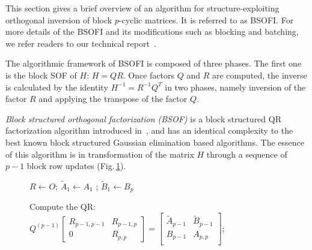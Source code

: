 \documentclass{llncs}
\begin{document}
This section gives a brief overview of an algorithm for 
structure-exploiting orthogonal inversion 
of block $p$-cyclic matrices. It is referred to as BSOFI. 
For more details of the BSOFI and its modifications such as blocking and batching, 
we refer readers to our technical report~\cite{GogolenkoBai13}.

The algorithmic framework of BSOFI is composed of three phases. 
The first one is the block SOF of $H$: $H = QR$.
Once factors $Q$ and $R$ are computed, 
the inverse is calculated by the identity $H^{-1} = R^{-1}Q^T$
in two phases, namely inversion of the factor $R$ 
and applying the transpose of the factor $Q$.

\textit{Block structured orthogonal factorization (BSOF)} 
is a block structured QR factorization algorithm introduced 
in~\cite{Wright92BSOF}, and has an identical complexity to the best known 
block structured Gaussian elimination based algorithms. 
The essence of this algorithm is 
in transformation of the matrix $H$ 
through a sequence of $p-1$ block row updates (Fig.\,\ref{alg:BSOF}). 

\begin{figure}[t]  
\centering 
\begin{algorithm}[H]%

  \BlankLine

  $R \gets O$; $\tilde{A}_1 \gets A_1$ ; $\tilde{B}_1 \gets B_p$\; 

  
  Compute the QR: 
  $Q^{(p-1)} 
  \begin{bmatrix}
    R_{p-1,p-1} & R_{p-1,p}\\
    0 & R_{p,p}
  \end{bmatrix}
  = \begin{bmatrix}
    \tilde{A}_{p-1} & \tilde{B}_{p-1}\\ 
    {B}_{p-1} & {A}_{p,p}\\ 
  \end{bmatrix}$;
\end{algorithm}
\label{alg:BSOF}
\end{figure} 
\end{document}
